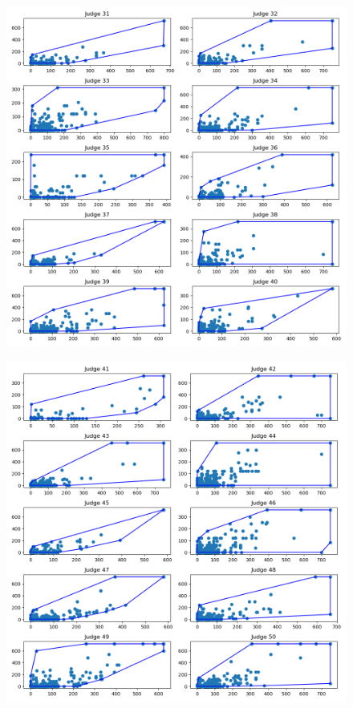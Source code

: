 \documentclass[11pt, oneside]{article}   	%
\theoremstyle{ModifiedStyle}
\begin{document}
	\begin{figure}[H]
		\centering
		\includegraphics[width=\textwidth]{../../output/figures/Exploration/judge_convex_hulls_3.png}
	\end{figure}

	\begin{figure}[H]
		\centering
		\includegraphics[width=\textwidth]{../../output/figures/Exploration/judge_convex_hulls_4.png}
	\end{figure}
\end{document}
